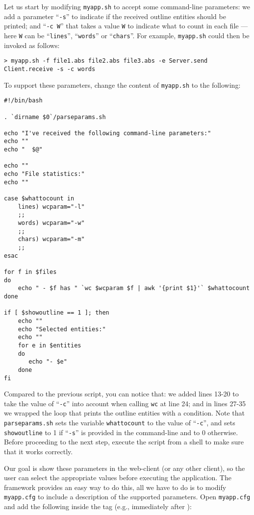 Let us start by modifying \texttt{myapp.sh} to accept some
command-line parameters: we add a parameter ``\texttt{-s}'' to
indicate if the received outline entities should be printed; and
``\texttt{-c W}'' that takes a value \texttt{W} to indicate what to
count in each file --- here \texttt{W} can be ``\texttt{lines}'',
``\texttt{words}'' or ``\texttt{chars}''.
%
For example, \texttt{myapp.sh} could then be invoked as follows:


\medskip
\begin{lstlisting}
> myapp.sh -f file1.abs file2.abs file3.abs -e Server.send Client.receive -s -c words
\end{lstlisting}

\medskip
\noindent
To support these parameters, change the content of \texttt{myapp.sh}
to the following:

\medskip
\begin{lstlisting}[style=script]
#!/bin/bash

. `dirname $0`/parseparams.sh

echo "I've received the following command-line parameters:"
echo ""
echo "  $@"

echo ""
echo "File statistics:"
echo ""

case $whattocount in
    lines) wcparam="-l"
    ;;
    words) wcparam="-w"
    ;;
    chars) wcparam="-m"
    ;;
esac

for f in $files 
do
    echo " - $f has " `wc $wcparam $f | awk '{print $1}'` $whattocount
done

if [ $showoutline == 1 ]; then
    echo ""
    echo "Selected entities:"
    echo ""
    for e in $entities 
    do
       echo "- $e"
    done
fi
\end{lstlisting}

\medskip
\noindent
Compared to the previous script, you can notice that: we added lines
13-20 to take the value of ``\texttt{-c}'' into account when calling
\texttt{wc} at line 24; and in lines 27-35 we wrapped the loop that
prints the outline entities with a condition.
%
Note that \texttt{parseparams.sh} sets the variable
\texttt{whattocount} to the value of ``\texttt{-c}'', and sets
\texttt{showoutline} to 1 if ``\texttt{-s}'' is provided in the
command-line and to 0 otherwise. Before proceeding to the next step,
execute the script from a shell to make sure that it works correctly.

Our goal is show these parameters in the web-client (or any other
client), so the user can select the appropriate values before
executing the application. The \ei framework provides an easy way to
do this, all we have to do is to modify \texttt{myapp.cfg} to include
a description of the supported parameters. Open \texttt{myapp.cfg} and
add the following inside the  tag (e.g., immediately after
):

